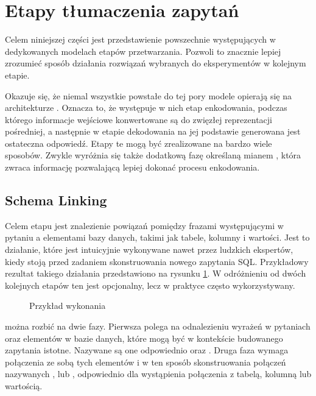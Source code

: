 \section{Etapy tłumaczenia zapytań} \label{specific-stages}
Celem niniejszej części jest przedstawienie powszechnie występujących w dedykowanych modelach  etapów przetwarzania. Pozwoli to znacznie lepiej zrozumieć sposób działania rozwiązań wybranych do eksperymentów w kolejnym etapie.

Okazuje się, że niemal wszystkie powstałe do tej pory modele opierają się na architekturze . Oznacza to, że występuje w nich etap enkodowania, podczas którego informacje wejściowe konwertowane są do zwięzłej reprezentacji pośredniej, a następnie w etapie dekodowania na jej podstawie generowana jest ostateczna odpowiedź. Etapy te mogą być zrealizowane na bardzo wiele sposobów. Zwykle wyróżnia się także dodatkową fazę określaną mianem , która zwraca informację pozwalającą lepiej dokonać procesu enkodowania. 

\subsection{Schema Linking}
Celem etapu  jest znalezienie powiązań pomiędzy frazami występującymi w pytaniu a elementami bazy danych, takimi jak tabele, kolumny i wartości. Jest to działanie, które jest intuicyjnie wykonywane nawet przez ludzkich ekspertów, kiedy stoją przed zadaniem skonstruowania nowego zapytania SQL. Przykładowy rezultat takiego działania przedstawiono na rysunku \ref{fig:schema-linking}. W odróżnieniu od dwóch kolejnych etapów ten jest opcjonalny, lecz w praktyce często wykorzystywany.

\begin{figure}[ht!]
  \centering
  
  \caption{Przykład wykonania }
  \label{fig:schema-linking}
\end{figure}

 można rozbić na dwie fazy. Pierwsza polega na odnalezieniu wyrażeń w pytaniach oraz elementów w bazie danych, które mogą być w kontekście budowanego zapytania istotne. Nazywane są one odpowiednio  oraz . Druga faza  wymaga połączenia ze sobą tych elementów i w ten sposób skonstruowania połączeń nazywanych ,  lub , odpowiednio dla wystąpienia połączenia z tabelą, kolumną lub wartością.


